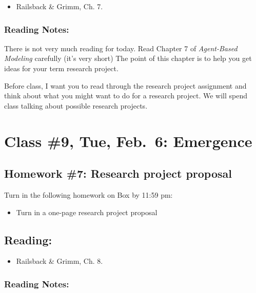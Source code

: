 \documentclass[]{article}
\providecommand{\tightlist}{%
  \setlength{\itemsep}{0pt}\setlength{\parskip}{0pt}}
\begin{document}
\begin{itemize}
\tightlist
\item
  Railsback \& Grimm, Ch. 7.
\end{itemize}

\hypertarget{reading-notes-6}{%
\subsubsection{Reading Notes:}\label{reading-notes-6}}

There is not very much reading for today. Read Chapter 7 of
\emph{Agent-Based Modeling} carefully (it's very short) The point of
this chapter is to help you get ideas for your term research project.

Before class, I want you to read through the research project assignment
and think about what you might want to do for a research project. We
will spend class talking about possible research projects.

\hypertarget{class-9-tue-feb.6-emergence}{%
\section{Class \#9, Tue, Feb.~6:
Emergence}\label{class-9-tue-feb.6-emergence}}

\hypertarget{homework-7-research-project-proposal}{%
\subsection{Homework \#7: Research project
proposal}\label{homework-7-research-project-proposal}}

Turn in the following homework on Box by 11:59 pm:

\begin{itemize}
\tightlist
\item
  Turn in a one-page research project proposal
\end{itemize}

\hypertarget{reading-8}{%
\subsection{Reading:}\label{reading-8}}

\begin{itemize}
\tightlist
\item
  Railsback \& Grimm, Ch. 8.
\end{itemize}

\hypertarget{reading-notes-7}{%
\subsubsection{Reading Notes:}\label{reading-notes-7}}
\end{document}
